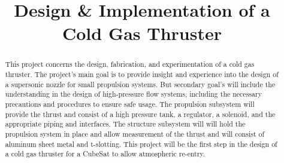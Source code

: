 \documentclass[conference]{IEEEtran} %
\title{Design \& Implementation of a Cold Gas Thruster}
\author{
  \IEEEauthorblockN{%
    James~Emerson~Parkus\IEEEauthorrefmark{1},  %
    David~Breen\IEEEauthorrefmark{2}
  }
  \IEEEauthorblockA{%
    RIT Space Exploration, Rochester Institute of Technology \\ %
    Rochester, N.Y. \\
    Email:
    \IEEEauthorrefmark{1}jep7631@rit.edu,
    \IEEEauthorrefmark{2}djb1410@rit.edu
}


}
\begin{document}
\maketitle%

\begin{abstract}
  This project concerns the design, fabrication, and experimentation of a cold gas thruster. The project's main goal is to provide insight
  and experience into the design of a supersonic nozzle for small propulsion systems. But secondary goal's will include the understanding
  in the design of high-pressure flow systems, including the necessary precautions and procedures to ensure safe usage. The propulsion subsystem
  will provide the thrust and consist of a high pressure tank, a regulator, a solenoid, and the appropriate piping and interfaces. The structure subsystem will
  will hold the propulsion system in place and allow measurement of the thrust and will consist of aluminum sheet metal and t-slotting. This project will be the first
  step in the design of a cold gas thruster for a CubeSat to allow atmospheric re-entry.
\end{abstract}
\end{document}
